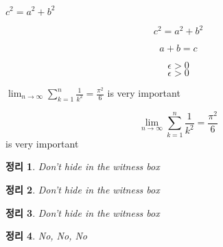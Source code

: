 \documentclass{report}
\begin{document}
$c^2=a^2+b^2$
 
\begin{displaymath} c^{2}=a^{2}+b^{2} \end{displaymath}

\[a+b=c\]

\begin{equation} \label{eq:eps} \epsilon > 0 \end{equation} 
\begin{equation} \label{eq:eps} \epsilon > 0 \end{equation} 

$\lim_{n \to \infty} \sum_{k=1}^n \frac{1}{k^2} = \frac{\pi^2}{6}$ is very important

\begin{displaymath} \lim_{n \to \infty} \sum_{k=1}^n \frac{1}{k^2} = \frac{\pi^2}{6} \end{displaymath} is very important \\


\newtheorem{law}{정리}

\begin{law} 
\label{law:box} Don’t hide in the witness box 
\end{law} 
\begin{law} 
\label{law:box} Don’t hide in the witness box 
\end{law}
\begin{law} 
\label{law:box} Don’t hide in the witness box 
\end{law}

\begin{law}No, No, No\end{law}
\end{document}

